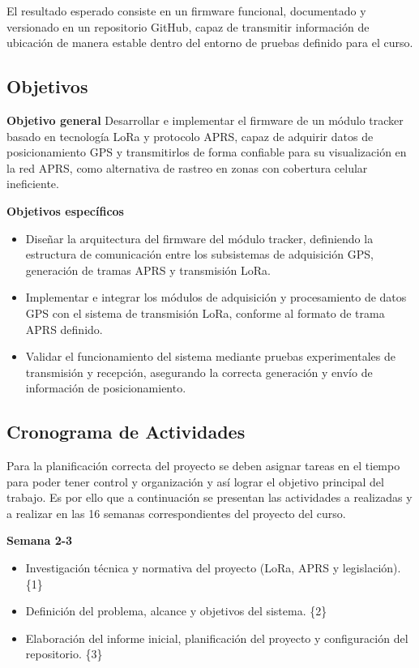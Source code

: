 \documentclass[conference]{IEEEtran}
\begin{document}
El resultado esperado consiste en un firmware funcional, documentado y versionado en un repositorio GitHub, capaz de transmitir información de ubicación de manera estable dentro del entorno de pruebas definido para el curso.

\subsection{Objetivos}

\textbf{Objetivo general}\newline
Desarrollar e implementar el firmware de un módulo tracker basado en tecnología LoRa y protocolo APRS, capaz de adquirir datos de posicionamiento GPS y transmitirlos de forma confiable para su visualización en la red APRS, como alternativa de rastreo en zonas con cobertura celular ineficiente.

\textbf{Objetivos específicos}
\begin{itemize}
    \item Diseñar la arquitectura del firmware del módulo tracker, definiendo la estructura de comunicación entre los subsistemas de adquisición GPS, generación de tramas APRS y transmisión LoRa.
    \item Implementar e integrar los módulos de adquisición y procesamiento de datos GPS con el sistema de transmisión LoRa, conforme al formato de trama APRS definido.
    \item Validar el funcionamiento del sistema mediante pruebas experimentales de transmisión y recepción, asegurando la correcta generación y envío de información de posicionamiento.
\end{itemize}

\subsection{Cronograma de Actividades}

Para la planificación correcta del proyecto se deben asignar tareas en el tiempo para poder tener control y organización y así lograr el objetivo principal del trabajo. Es por ello que a continuación se presentan las actividades a realizadas y a realizar en las 16 semanas correspondientes del proyecto del curso.

\textbf{Semana 2-3}

\begin{itemize}
    \item Investigación técnica y normativa del proyecto (LoRa, APRS y legislación). \{1\}
    \item Definición del problema, alcance y objetivos del sistema. \{2\}
    \item Elaboración del informe inicial, planificación del proyecto y configuración del repositorio. \{3\}
\end{itemize}
\end{document}
